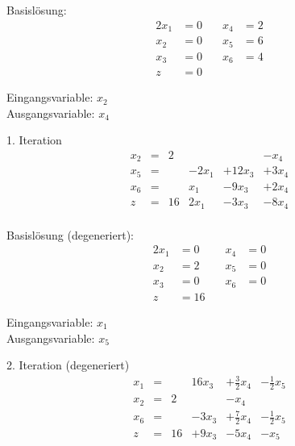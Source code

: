 \documentclass[a4paper]{scrartcl}
\begin{document}
\begin{enumerate}
        Basislösung:
        \begin{alignat*}{2}
            x_1 &= 0 &\quad x_4 &= 2 \\
            x_2 &= 0 &\quad x_5 &= 6 \\
            x_3 &= 0 &\quad x_6 &= 4 \\
            z &= 0
        \end{alignat*}

        Eingangsvariable: $x_2$ \\
        Ausgangsvariable: $x_4$

        1. Iteration
        \begin{equation}
            \begin{array}{rcrrrr}
                x_2 & = & 2 &  &  & -x_4 \\
                x_5 & = &   & -2x_1 & + 12x_3 & +3x_4 \\
                x_6 & = &   & x_1 & -9x_3 & +2x_4 \\
                \hline
                z   & = & 16 & 2x_1 & -3x_3 & -8x_4 \\
            \end{array}
        \end{equation}

        Basislösung (degeneriert):
        \begin{alignat*}{2}
            x_1 &= 0 &\quad x_4 &= 0 \\
            x_2 &= 2 &\quad x_5 &= 0 \\
            x_3 &= 0 &\quad x_6 &= 0 \\
            z &= 16
        \end{alignat*}

        Eingangsvariable: $x_1$ \\
        Ausgangsvariable: $x_5$

        2. Iteration (degeneriert)
        \begin{equation}
            \begin{array}{rcrrrr}
                x_1 & = &   & 16x_3 & +\frac{3}{2}x_4 & -\frac{1}{2}x_5 \\
                x_2 & = & 2 &  & -x_4 & \\
                x_6 & = &   & -3x_3 & +\frac{7}{2}x_4 & -\frac{1}{2}x_5 \\
                \hline
                z   & = & 16 & +9x_3 & -5x_4 & -x_5\\
            \end{array}
        \end{equation}


\end{enumerate}
\end{document}
